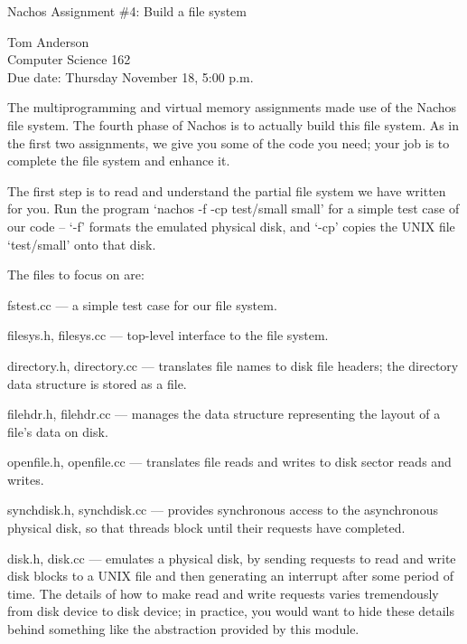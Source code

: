 


\begin{center}
{\large Nachos Assignment \#4: Build a file system

\vspace{.2in}
Tom Anderson\\
Computer Science 162\\
Due date: Thursday November 18, 5:00 p.m.}
\end{center}

\vspace{.2in}

The multiprogramming and virtual memory assignments made use
of the Nachos file system.
The fourth phase of Nachos is to actually build this file system.
As in the first two assignments, we give you some of the code
you need; your job is to complete the file system and enhance it.

The first step is to read and understand the partial file system
we have written for you.  
Run the program `nachos -f -cp test/small small' for a simple test case
of our code -- `-f' formats the emulated physical disk, and `-cp'
copies the UNIX file `test/small' onto that disk.

The files to focus on are:

\begin{description}

\item fstest.cc --- a simple test case for our file system.

\item filesys.h, filesys.cc --- top-level interface to the file system.

\item directory.h, directory.cc --- translates file names to disk file
headers; the directory data structure is stored as a file.

\item filehdr.h, filehdr.cc --- manages the data structure representing
the layout of a file's data on disk.

\item openfile.h, openfile.cc --- translates file reads and writes to
disk sector reads and writes.

\item synchdisk.h, synchdisk.cc --- provides synchronous
access to the asynchronous physical disk, so that threads block until 
their requests have completed.

\item disk.h, disk.cc --- emulates a physical disk, by sending requests 
to read and write disk blocks to a UNIX file and then generating an interrupt 
after some period of time.
The details of how to make read and write requests varies tremendously
from disk device to disk device; in practice, you would want to hide 
these details behind something like the abstraction provided by this module.

\end{description}

